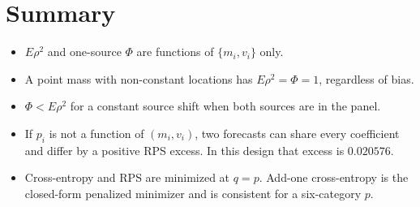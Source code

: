 \documentclass[11pt]{article}
\begin{document}
\section*{Summary}

\begin{itemize}
\item $E\rho^2$ and one-source $\Phi$ are functions of $\{m_i,v_i\}$ only.
\item A point mass with non-constant locations has $E\rho^2=\Phi=1$, regardless of bias.
\item $\Phi<E\rho^2$ for a constant source shift when both sources are in the panel.
\item If $p_i$ is not a function of $(m_i,v_i)$, two forecasts can share every coefficient and differ by a positive RPS excess. In this design that excess is $0.020576$.
\item Cross-entropy and RPS are minimized at $q=p$. Add-one cross-entropy is the closed-form penalized minimizer and is consistent for a six-category $p$.
\end{itemize}
\end{document}
